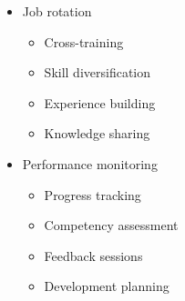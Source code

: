 \begin{itemize}
\begin{itemize}
        \item Job rotation
        \begin{itemize}
            \item Cross-training
            \item Skill diversification
            \item Experience building
            \item Knowledge sharing
        \end{itemize}
        
        \item Performance monitoring
        \begin{itemize}
            \item Progress tracking
            \item Competency assessment
            \item Feedback sessions
            \item Development planning
        \end{itemize}
    \end{itemize}
\end{itemize} 